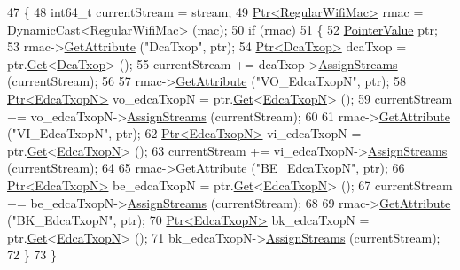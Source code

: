 \begin{DoxyCode}
47 \{
48   int64\_t currentStream = stream;
49   \hyperlink{classns3_1_1Ptr}{Ptr<RegularWifiMac>} rmac = DynamicCast<RegularWifiMac> (mac);
50   \textcolor{keywordflow}{if} (rmac)
51     \{
52       \hyperlink{classns3_1_1PointerValue}{PointerValue} ptr;
53       rmac->\hyperlink{classns3_1_1ObjectBase_a895d1de2f96063d0e0fd78463e7a7e30}{GetAttribute} (\textcolor{stringliteral}{"DcaTxop"}, ptr);
54       \hyperlink{classns3_1_1Ptr}{Ptr<DcaTxop>} dcaTxop = ptr.\hyperlink{classns3_1_1PointerValue_ae8e90fe3c0810cd6e4e1b1ba31f52a66}{Get}<\hyperlink{classns3_1_1DcaTxop}{DcaTxop}> ();
55       currentStream += dcaTxop->\hyperlink{classns3_1_1DcaTxop_a2a883932e6a255a5478c9594974dcdaa}{AssignStreams} (currentStream);
56 
57       rmac->\hyperlink{classns3_1_1ObjectBase_a895d1de2f96063d0e0fd78463e7a7e30}{GetAttribute} (\textcolor{stringliteral}{"VO\_EdcaTxopN"}, ptr);
58       \hyperlink{classns3_1_1Ptr}{Ptr<EdcaTxopN>} vo\_edcaTxopN = ptr.\hyperlink{classns3_1_1PointerValue_ae8e90fe3c0810cd6e4e1b1ba31f52a66}{Get}<\hyperlink{classns3_1_1EdcaTxopN}{EdcaTxopN}> ();
59       currentStream += vo\_edcaTxopN->\hyperlink{classns3_1_1DcaTxop_a2a883932e6a255a5478c9594974dcdaa}{AssignStreams} (currentStream);
60 
61       rmac->\hyperlink{classns3_1_1ObjectBase_a895d1de2f96063d0e0fd78463e7a7e30}{GetAttribute} (\textcolor{stringliteral}{"VI\_EdcaTxopN"}, ptr);
62       \hyperlink{classns3_1_1Ptr}{Ptr<EdcaTxopN>} vi\_edcaTxopN = ptr.\hyperlink{classns3_1_1PointerValue_ae8e90fe3c0810cd6e4e1b1ba31f52a66}{Get}<\hyperlink{classns3_1_1EdcaTxopN}{EdcaTxopN}> ();
63       currentStream += vi\_edcaTxopN->\hyperlink{classns3_1_1DcaTxop_a2a883932e6a255a5478c9594974dcdaa}{AssignStreams} (currentStream);
64 
65       rmac->\hyperlink{classns3_1_1ObjectBase_a895d1de2f96063d0e0fd78463e7a7e30}{GetAttribute} (\textcolor{stringliteral}{"BE\_EdcaTxopN"}, ptr);
66       \hyperlink{classns3_1_1Ptr}{Ptr<EdcaTxopN>} be\_edcaTxopN = ptr.\hyperlink{classns3_1_1PointerValue_ae8e90fe3c0810cd6e4e1b1ba31f52a66}{Get}<\hyperlink{classns3_1_1EdcaTxopN}{EdcaTxopN}> ();
67       currentStream += be\_edcaTxopN->\hyperlink{classns3_1_1DcaTxop_a2a883932e6a255a5478c9594974dcdaa}{AssignStreams} (currentStream);
68 
69       rmac->\hyperlink{classns3_1_1ObjectBase_a895d1de2f96063d0e0fd78463e7a7e30}{GetAttribute} (\textcolor{stringliteral}{"BK\_EdcaTxopN"}, ptr);
70       \hyperlink{classns3_1_1Ptr}{Ptr<EdcaTxopN>} bk\_edcaTxopN = ptr.\hyperlink{classns3_1_1PointerValue_ae8e90fe3c0810cd6e4e1b1ba31f52a66}{Get}<\hyperlink{classns3_1_1EdcaTxopN}{EdcaTxopN}> ();
71       bk\_edcaTxopN->\hyperlink{classns3_1_1DcaTxop_a2a883932e6a255a5478c9594974dcdaa}{AssignStreams} (currentStream);
72     \}
73 \}
\end{DoxyCode}


